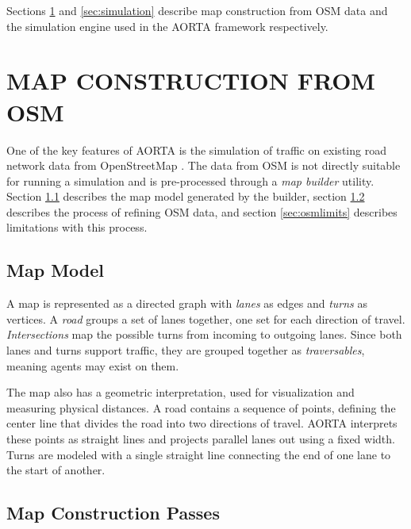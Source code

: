 \documentclass[letterpaper, 10 pt, conference]{ieeeconf}  %
\begin{document}
Sections \ref{sec:map} and \ref{sec:simulation} describe map construction from
OSM data and the simulation engine used in the AORTA framework respectively.


\section{MAP CONSTRUCTION FROM OSM}
\label{sec:map}

One of the key features of AORTA is the simulation of traffic on existing road
network data from OpenStreetMap \cite{osm}. The data from OSM is not directly
suitable for running a simulation and is pre-processed through a \emph{map
builder} utility. Section \ref{sec:mapmodel} describes the map model generated
by the builder, section \ref{sec:mapconstruction} describes the process of
refining OSM data, and section \ref{sec:osmlimits} describes limitations with
this process.

\subsection{Map Model}
\label{sec:mapmodel}

A map is represented as a directed graph with \emph{lanes} as edges and
\emph{turns} as vertices. A \emph{road} groups a set of lanes together, one set
for each direction of travel. \emph{Intersections} map the possible turns from
incoming to outgoing lanes.  Since both lanes and turns support traffic, they
are grouped together as \emph{traversables}, meaning agents may exist on them.

The map also has a geometric interpretation, used for visualization and
measuring physical distances. A road contains a sequence of points, defining
the center line that divides the road into two directions of travel. AORTA
interprets these points as straight lines and projects parallel lanes out using
a fixed width. Turns are modeled with a single straight line connecting the end
of one lane to the start of another.

\subsection{Map Construction Passes}
\label{sec:mapconstruction}
\end{document}
